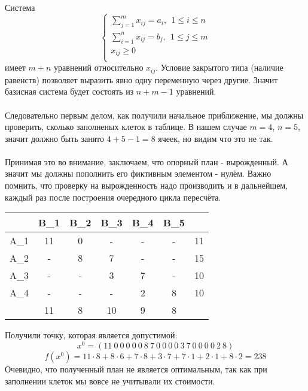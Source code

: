 \documentclass{article}
\begin{document}
\noindent Система 
\begin{equation*}
    \begin{cases}
    \displaystyle\sum_{j=1}^{m} x_{ij} = a_i,~~1 \le i \le n\\
    \displaystyle\sum_{i=1}^{n} x_{ij} = b_j,~~1 \le j \le m\\
    x_{ij} \ge 0\\
    \end{cases}
\end{equation*}
имеет $m+n$ уравнений относительно $x_{ij}$. Условие закрытого типа (наличие равенств) позволяет выразить явно одну переменную через другие. Значит базисная система будет состоять из $n + m - 1$ уравнений.
\\\\
Следовательно первым делом, как получили начальное приближение, мы должны проверить, сколько заполненых клеток в таблице. В нашем случае $m = 4$, $n = 5$, значит должно быть занято $4+5-1=8$ ячеек, но видим что это не так.
\\\\
\noindent Принимая это во внимание, заключаем, что опорный план - вырожденный. А значит мы должны пополнить его фиктивным элементом - нулём. Важно помнить, что проверку на вырожденность надо производить и в дальнейшем, каждый раз после построения очередного цикла пересчёта.
\begin{table}[H]
    \centering
    \begin{tabular}{|c|c|c|c|c|c| |c|}
    \hline
        &\cellcolor{myGren} B_1 & \cellcolor{myGren}B_2 & \cellcolor{myGren}B_3 & \cellcolor{myGren}B_4 & \cellcolor{myGren} B_5 &  \\ \hline
       \cellcolor{myGren} A_1 &  11 & 0 &- & - & - & 11\\ \hline
       \cellcolor{myGren} A_2 & - & 8 & 7 & - & - & 15\\  \hline
       \cellcolor{myGren} A_3 & - & - & 3 & 7 & - & 10\\ \hline
       \cellcolor{myGren} A_4 & - & - & - & 2 & 8 & 10\\ \hline \hline
            & 11 &  8 & 10 & 9 & 8 & \\
        \hline
    \end{tabular}
    \label{tab:my_label}
\end{table}

\noindent Получили точку, которая является допустимой:
  $$ x^{0}= (11~0~0~0~0~0~8~7~0~0~0~0~3~7~0~0~0~0~2~8)$$
  $$f(x^{0}) = 11\cdot 8 + 8\cdot 6 + 7 \cdot 8 + 3 \cdot 7 + 7 \cdot 1 + 2 \cdot 1 + 8\cdot 2 = 238$$
Очевидно, что полученный план не является оптимальным, так как при заполнении клеток мы вовсе не учитывали их стоимости.
\end{document}
